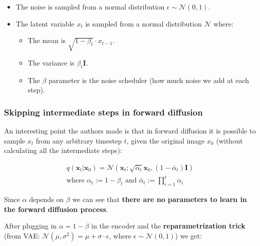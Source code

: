 \begin{itemize}
    \item The noise is sampled from a normal distribution $\epsilon \sim \mathcal{N}(0, 1)$.
    \item The latent variable $x_t$ is sampled from a normal distribution $\mathcal{N}$ where:
    \begin{itemize}
        \item The mean is $\sqrt{1-\beta_t} \cdot x_{t-1}$.
        \item The variance is $\beta_t \mathbf{I}$.
        \item The $\beta$ parameter is the noise scheduler (how much noise we add at each step).
    \end{itemize}
\end{itemize}



\subsubsection*{Skipping intermediate steps in forward diffusion}


An interesting point the authors made is that in forward diffusion it is possible to sample $x_t$ from any arbitrary timestep $t$, given the original image $x_0$ (without calculating all the intermediate steps):

\begin{equation}
    \begin{aligned}
    q(\mathbf{x}_t|\mathbf{x}_0) = \mathcal{N}(\mathbf{x}_t; \sqrt{\bar{\alpha}_t}\mathbf{x}_0, (1 - \bar{\alpha}_t)\mathbf{I}) \\
    \text{where } \alpha_t := 1 - \beta_t \text{ and } \bar{\alpha}_t := \prod_{i=1}^{t} \alpha_i
    \end{aligned}
    \label{eq:forward_diffusion}
\end{equation}

Since $\alpha$ depends on $\beta$ we can see that \textbf{there are no parameters to learn in the forward diffusion process}.

After plugging in $\alpha = 1 - \beta$ in the encoder and the \textbf{reparametrization trick} (from VAE: $\mathcal{N} (\mu, \sigma^2) = \mu + \sigma \cdot \epsilon \text{, where } \epsilon \sim \mathcal{N}(0, 1) $) we get:

